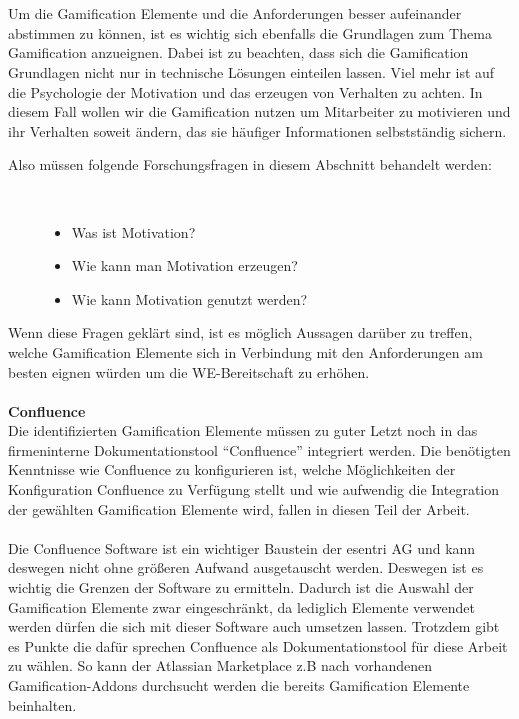 \documentclass[a4paper,12pt]{scrartcl}
\begin{document}
\\\\
Um die Gamification Elemente und die Anforderungen besser aufeinander abstimmen zu können, ist es wichtig sich ebenfalls die Grundlagen zum Thema Gamification anzueignen. Dabei ist zu beachten, dass sich die Gamification Grundlagen nicht nur in technische Lösungen einteilen lassen. Viel mehr ist auf die Psychologie der Motivation und das erzeugen von Verhalten zu achten. In diesem Fall wollen wir die Gamification nutzen um Mitarbeiter zu motivieren und ihr Verhalten soweit ändern, das sie häufiger Informationen selbstständig sichern.
\begin{description}
   \item[Also müssen folgende Forschungsfragen in diesem Abschnitt behandelt werden:]~\par
   \begin{itemize}
      \item Was ist Motivation?
      \item Wie kann man Motivation erzeugen?
      \item Wie kann Motivation genutzt werden?
   \end{itemize}
\end{description}
Wenn diese Fragen geklärt sind, ist es möglich Aussagen darüber zu treffen, welche Gamification Elemente sich in Verbindung mit den Anforderungen am besten eignen würden um die WE-Bereitschaft zu erhöhen.
\\\\
\textbf{Confluence}\\
Die identifizierten Gamification Elemente müssen zu guter Letzt noch in das firmeninterne Dokumentationstool \enquote{Confluence} integriert werden. Die benötigten Kenntnisse wie Confluence zu konfigurieren ist, welche Möglichkeiten der Konfiguration Confluence zu Verfügung stellt und wie aufwendig die Integration der gewählten Gamification Elemente wird, fallen in diesen Teil der Arbeit. 
\\\\
Die Confluence Software ist ein wichtiger Baustein der esentri AG und kann deswegen nicht ohne größeren Aufwand ausgetauscht werden. Deswegen ist es wichtig die Grenzen der Software zu ermitteln. Dadurch ist die Auswahl der Gamification Elemente zwar eingeschränkt, da lediglich Elemente verwendet werden dürfen die sich mit dieser Software auch umsetzen lassen. Trotzdem gibt es Punkte die dafür sprechen Confluence als Dokumentationstool für diese Arbeit zu wählen. So kann der Atlassian Marketplace z.B nach vorhandenen Gamification-Addons durchsucht werden die bereits Gamification Elemente beinhalten.
\end{document}
